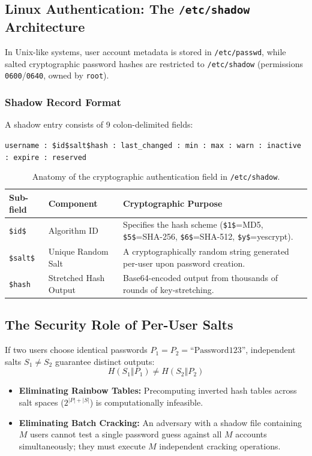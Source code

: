 \documentclass[11pt,a4paper]{article}
\begin{document}
\subsection{Linux Authentication: The \texttt{/etc/shadow} Architecture}
In Unix-like systems, user account metadata is stored in \texttt{/etc/passwd}, while salted cryptographic password hashes are restricted to \texttt{/etc/shadow} (permissions \texttt{0600}/\texttt{0640}, owned by \texttt{root}).

\subsubsection{Shadow Record Format}
A shadow entry consists of 9 colon-delimited fields:
\begin{center}
\texttt{username : \$id\$salt\$hash : last\_changed : min : max : warn : inactive : expire : reserved}
\end{center}

\begin{table}[h!]
\centering
\small
\begin{tabular}{@{}llp{8.5cm}@{}}
\toprule
\textbf{Sub-field} & \textbf{Component} & \textbf{Cryptographic Purpose} \\ \midrule
\texttt{\$id\$} & Algorithm ID & Specifies the hash scheme (\texttt{\$1\$}=MD5, \texttt{\$5\$}=SHA-256, \texttt{\$6\$}=SHA-512, \texttt{\$y\$}=yescrypt). \\
\texttt{\$salt\$} & Unique Random Salt & A cryptographically random string generated per-user upon password creation. \\
\texttt{\$hash} & Stretched Hash Output & Base64-encoded output from thousands of rounds of key-stretching. \\
\bottomrule
\end{tabular}
\caption{Anatomy of the cryptographic authentication field in \texttt{/etc/shadow}.}
\end{table}

\subsection{The Security Role of Per-User Salts}
If two users choose identical passwords $P_1 = P_2 = \text{``Password123''}$, independent salts $S_1 \neq S_2$ guarantee distinct outputs:
\begin{equation}
H(S_1 \mathbin{\Vert} P_1) \neq H(S_2 \mathbin{\Vert} P_2)
\end{equation}
\begin{itemize}
    \item \textbf{Eliminating Rainbow Tables:} Precomputing inverted hash tables across salt spaces ($2^{|P| + |S|}$) is computationally infeasible.
    \item \textbf{Eliminating Batch Cracking:} An adversary with a shadow file containing $M$ users cannot test a single password guess against all $M$ accounts simultaneously; they must execute $M$ independent cracking operations.
\end{itemize}
\end{document}
